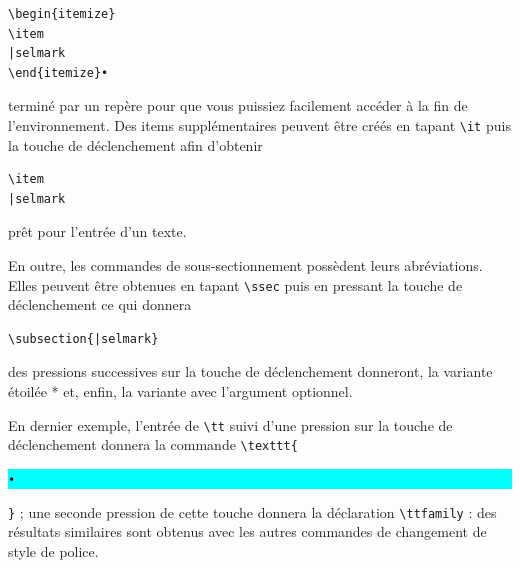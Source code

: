 \documentclass[11pt,french]{article}
\newcommand{\cmd}[1]{\textsf{#1}}
\newcommand{\selmark}{\colorbox{cyan}{\rule[-0.5ex]{0ex}{2.1ex}\texttt{•}}}
\begin{document}
%
\begin{verbatim}
\begin{itemize}
\item
|selmark
\end{itemize}•
\end{verbatim}
terminé par un repère pour que vous puissiez facilement accéder à la fin de l'environnement. Des items supplémentaires peuvent être créés en tapant \verb|\it| puis la touche de déclenchement afin d'obtenir
\begin{verbatim}
\item
|selmark
\end{verbatim}
prêt pour l'entrée d'un texte.

En outre, les commandes de sous-sectionnement possèdent leurs abréviations. Elles peuvent être obtenues en tapant  \verb|\ssec| puis en pressant la touche de déclenchement ce qui donnera

\begin{verbatim}
\subsection{|selmark}
\end{verbatim}
des pressions successives sur la touche de déclenchement donneront, la variante étoilée * et, enfin, la variante avec l'argument optionnel.

En dernier exemple, l'entrée de \verb|\tt| suivi d'une pression sur la touche de déclenchement donnera la commande \verb|\texttt{|\selmark\verb|}| ; une seconde pression de cette touche donnera la déclaration \verb|\ttfamily| : des résultats similaires sont obtenus avec les autres commandes de changement de style de police.
\end{document}
